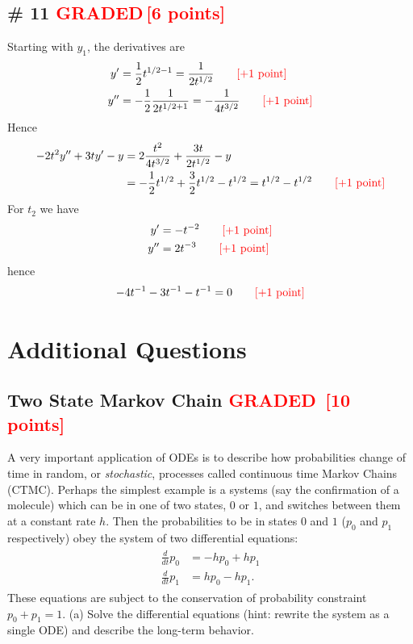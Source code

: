 \documentclass[12pt,letterpaper]{exam}
\newcommand{\grade}{\textcolor{red}{GRADED}}
\newcommand{\pts}[1]{\textcolor{red}{[#1]}}
\begin{document}
\subsection*{\# 11 \grade \,\pts{6 points}}
Starting with $y_1$, the derivatives are
\begin{align}
y' &= \frac{1}{2}t^{1/2-1} = \frac{1}{2t^{1/2}} \quad\quad \text{\pts{+1 point}}\\
y'' &= -\frac{1}{2} \frac{1}{2t^{1/2+1}} = -\frac{1}{4t^{3/2}} \quad\quad \text{\pts{+1 point}}
\end{align}
Hence 
\begin{align}
-2t^2y'' + 3ty' - y &= 2\frac{t^2}{4t^{3/2}}  +\frac{3t}{2t^{1/2}} - y\\
&= -\frac{1}{2}t^{1/2} + \frac{3}{2}t^{1/2} - t^{1/2} = t^{1/2} - t^{1/2} \quad\quad \text{\pts{+1 point}}
\end{align}
For $t_2$ we have
\begin{align}
y' &=-t^{-2}  \quad\quad \text{\pts{+1 point}}\\
y'' &= 2 t^{-3} \quad\quad \text{\pts{+1 point}}
\end{align}
hence 
\begin{align}
-4t^{-1} - 3t^{-1}- t^{-1} = 0  \quad\quad \text{\pts{+1 point}}
\end{align}


\section{Additional Questions}


\subsection*{Two State Markov Chain \grade \, \pts{10 points}}
A very important application of ODEs is to describe how probabilities change of time in random, or \emph{stochastic}, processes called continuous time Markov Chains (CTMC). Perhaps the simplest example is a systems (say the confirmation of a molecule) which can be in one of two states, $0$ or $1$, and switches between them at a constant rate $h$. Then the probabilities to be in states $0$ and $1$ ($p_0$ and $p_1$ respectively) obey the system of two differential equations: 
\begin{align}\label{eq:2state}
\begin{split}
\frac{d}{dt}p_0 &=  -hp_0 + h p_1 \\
\frac{d}{dt}p_1 &=  h p_0  - h p_1. 
\end{split}
\end{align}
These equations are subject to the conservation of probability constraint $p_0 + p_1 = 1$.  (a) Solve the differential equations (hint: rewrite the system as a single ODE) and describe the long-term behavior. 
\end{document}
